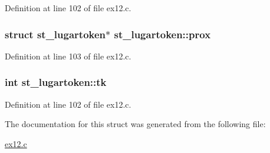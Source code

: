 Definition at line 102 of file ex12.\+c.

\hypertarget{structst__lugartoken_a274f4c1422ff1d2c56e58495734b4bc3}{
\subsubsection[{prox}]{\setlength{\rightskip}{0pt plus 5cm}struct {\bf st\+\_\+lugartoken}$\ast$ st\+\_\+lugartoken\+::prox}}\label{structst__lugartoken_a274f4c1422ff1d2c56e58495734b4bc3}


Definition at line 103 of file ex12.\+c.

\hypertarget{structst__lugartoken_a58b3c1ed10063127a3f50aefa336250c}{
\subsubsection[{tk}]{\setlength{\rightskip}{0pt plus 5cm}int st\+\_\+lugartoken\+::tk}}\label{structst__lugartoken_a58b3c1ed10063127a3f50aefa336250c}


Definition at line 102 of file ex12.\+c.



The documentation for this struct was generated from the following file\+:\begin{DoxyCompactItemize}
\item 
\hyperlink{ex12_8c}{ex12.\+c}\end{DoxyCompactItemize}
